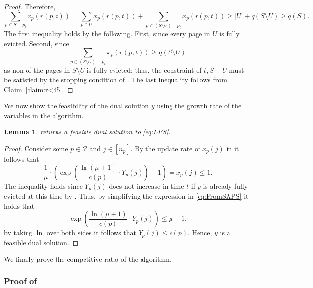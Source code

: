 \documentclass[11pt]{article}
\newcommand{\cP}{{\mathcal{P}}}
\newtheorem{lemma}[thm]{Lemma}
\begin{document}
\begin{proof}
	Therefore, 
	$$\sum_{p \in S-p_t} x_p(r(p,t)) = \sum_{p \in U} x_p(r(p,t))+\sum_{p \in (S\setminus U)-p_t} x_p(r(p,t)) \geq |U|+q(S \setminus U) \geq q(S).$$
	The first inequality holds by the following. First, since every page in $U$ is fully evicted. Second, since $$\sum_{p \in (S\setminus U)-p_t} x_p(r(p,t)) \geq q(S \setminus U)$$ as non of the pages in $S \setminus U$ is fully-evicted; thus, the constraint of $t,S-U$ must be satisfied by the stopping condition of .  The last inequality follows from Claim~\ref{claim:r<45}. 
\end{proof}


We now show the feasibility of the dual solution $y$ using the growth rate of the variables in the algorithm. 
	\begin{lemma}
	\label{lem:FFeasibleS}
	 returns a feasible dual solution to \eqref{eq:LPS}. 
\end{lemma}

\begin{proof}
	Consider some $p \in \cP$ and $j \in [n_p]$. By the update rate of $x_p(j)$ in  it follows that 
	\begin{equation}
		\label{eq:FromSAPS}
		\frac{1}{\mu} \cdot \left(     \exp \left(  \frac{\ln (\mu+1)}{c(p)} \cdot Y_p(j)\right)-1\right) = x_p(j) \leq 1.
	\end{equation} 
	The inequality holds since $Y_p(j)$ does not increase in time $t$ if $p$ is already fully evicted at this time by . Thus, by simplifying the expression in \eqref{eq:FromSAPS} it holds that 
	$$\exp \left( \frac{\ln (\mu+1)}{c(p)} \cdot Y_p(j) \right) \leq \mu+1.$$
	by taking $\ln$ over both sides it follows that $Y_p(j) \leq c(p)$. Hence, $y$ is a feasible dual solution. 
\end{proof}

We finally prove the competitive ratio of the algorithm.


\subsubsection*{Proof of }
\end{document}
